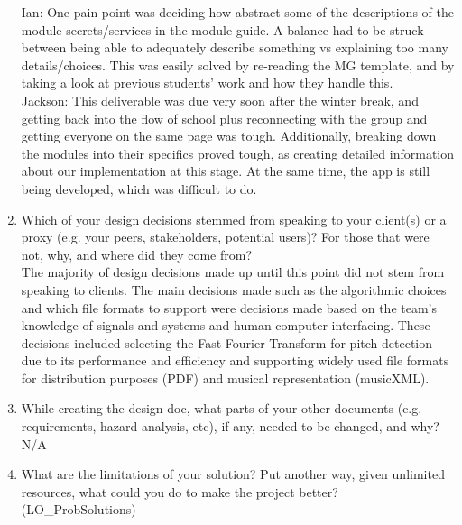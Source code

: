 \documentclass[12pt, titlepage]{article}
\begin{document}
\begin{enumerate}
    Ian:  One pain point was deciding how abstract some of the descriptions of the module 
    secrets/services in the module guide. A balance had to be struck between being able to 
    adequately describe something vs explaining too many details/choices. This was easily solved 
    by re-reading the MG template, and by taking a look at previous students’ work and how 
    they handle this. \\

    Jackson: This deliverable was due very soon after the winter break, and getting back into 
    the flow of school plus reconnecting with the group and getting everyone on the same page 
    was tough. Additionally, breaking down the modules into their specifics proved tough, as 
    creating detailed information about our implementation at this stage. At the same time, 
    the app is still being developed, which was difficult to do. \\

    
  \item Which of your design decisions stemmed from speaking to your client(s)
  or a proxy (e.g. your peers, stakeholders, potential users)? For those that
  were not, why, and where did they come from? \\

    The majority of design decisions made up until this point did not stem from speaking to clients. 
    The main decisions made such as the algorithmic choices and which file formats to support were 
    decisions made based on the team’s knowledge of signals and systems and human-computer interfacing. 
    These decisions included selecting the Fast Fourier Transform for pitch detection due to its 
    performance and efficiency and supporting widely used file formats for distribution purposes (PDF) 
    and musical representation (musicXML). \\

  \item While creating the design doc, what parts of your other documents (e.g.
  requirements, hazard analysis, etc), if any, needed to be changed, and why? \\

    N/A \\

  \item What are the limitations of your solution? Put another way, given
  unlimited resources, what could you do to make the project better? (LO\_ProbSolutions) \\


\end{enumerate}
\end{document}
